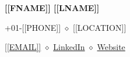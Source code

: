
\begingroup
    \hfil{\MakeUppercase{\LARGE\bf [[FNAME]] [[LNAME]]}}\hfil
    \medskip\break
\endgroup

\begingroup
    \def\\{$\diamond$ } %
    \centerline{+01-[[PHONE]] \\ [[LOCATION]]}
\endgroup
\smallskip

\begingroup
    \def\\{$\diamond$ } %
    \centerline{\href{mailto:[[EMAIL]]}{[[EMAIL]]} \\ 
                \href{[[LINKEDIN]]}{LinkedIn} \\ 
                \href{[[WEBSITE]]}{Website}}
\endgroup
\smallskip
